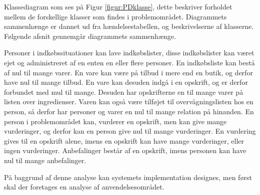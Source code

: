 Klassediagram som ses på Figur \ref{figur:PDklasse}, dette beskriver forholdet mellem de forskellige klasser som findes i problemområdet. Diagrammets sammenhænge er dannet ud fra hændelsestabellen, og beskrivelserne af klasserne. Følgende afsnit gennemgår diagrammets sammenhænge.

Personer i indkøbssituationer kan lave indkøbslister, disse indkøbslister kan været ejet og administreret af en enten en eller flere personer.
En indkøbsliste kan bestå af nul til mange varer.
En vare kan være på tilbud i mere end en butik, og derfor have nul til mange tilbud.
En vare kan desuden indgå i en opskrift, og er derfor forbundet med mul til mange.
Desuden har opskrifterne en til mange varer på listen over ingredienser.
Varen kan også være tilføjet til overvågningslisten hos en person, så derfor har personer og varer en nul til mange relation på hinanden.
En person i problemområdet kan, vurderer en opskrift, men kan give mange vurderinger, og derfor kan en person give nul til mange vurderinger. 
En vurdering gives til en opskrift alene, imens en opskrift kan have mange vurderinger, eller ingen vurderinger.
Anbefalinger består af en opskrift, imens personen kan have nul til mange anbefalinger.

På baggrund af denne analyse kan systemets implementation designes, men først skal der foretages en analyse af anvendelsesområdet.
